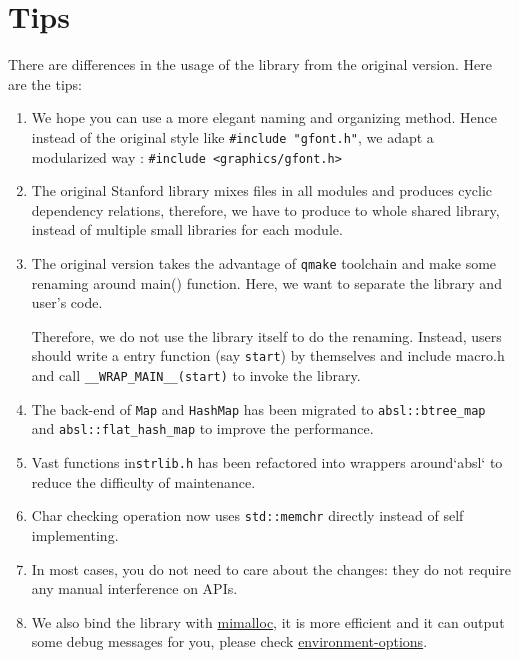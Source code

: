 \documentclass[a4paper,12pt]{report}
\begin{document}
 \chapter{Tips}
 There are differences in the usage of the library from the original version. Here are the tips:
 
 \begin{enumerate}
 	

 \item  We hope you can use a more elegant naming and organizing method. Hence instead of the original style like \texttt{#include "gfont.h"}, we adapt a modularized way : \texttt{#include <graphics/gfont.h>}
 \item  The original Stanford library mixes files in all modules and produces cyclic dependency relations, therefore, we have to produce to whole shared library, instead of multiple small libraries for each module.

 \item  The original version takes the advantage of \texttt{qmake} toolchain and make some renaming around main() function. Here, we want to separate the library and user's code.

 Therefore, we do not use the library itself to do the renaming. Instead, users should write a entry function (say \texttt{start}) by themselves and include macro.h and call \texttt{__WRAP_MAIN__(start)} to invoke the library.

 \item  The back-end of \texttt{Map} and \texttt{HashMap} has been migrated to \texttt{absl::btree_map} and \texttt{absl::flat_hash_map} to improve the performance.

 \item Vast functions in\texttt{strlib.h} has been refactored into wrappers around`absl` to reduce the difficulty of maintenance.

 \item Char checking operation now uses \texttt{std::memchr} directly instead of self implementing.

 \item In most cases, you do not need to care about the changes: they do not require any manual interference on APIs.

 \item  We also bind the library with \href{https://github.com/microsoft/mimalloc}{mimalloc}, it is more efficient and it can output some debug messages for you, please check \href{https://github.com/microsoft/mimalloc#environment-options}{environment-options}.
  \end{enumerate}
 
\end{document}
